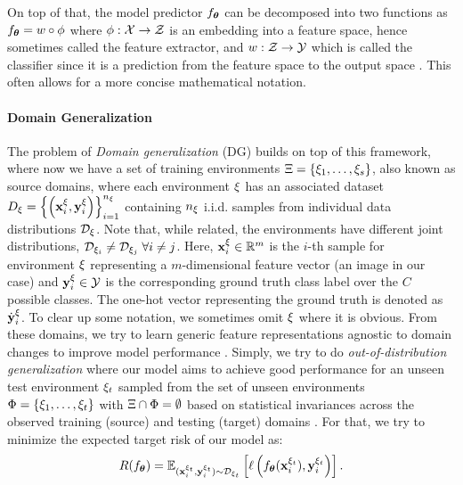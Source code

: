 On top of that, the model predictor $f_{\boldsymbol{\theta}}$ can be decomposed into two functions as $f_{\boldsymbol{\theta}} = w \circ \phi$ where $\phi: \mathcal{X} \rightarrow \mathcal{Z}$ is an embedding into a feature space, hence sometimes called the feature extractor, and $w: \mathcal{Z} \rightarrow \mathcal{Y}$ which is called the classifier since it is a prediction from the feature space to the output space \citep{gulrajani2020search, MotiianPAD17}. This often allows for a more concise mathematical notation.

\paragraph{Domain Generalization}
The problem of \emph{Domain generalization} (DG) builds on top of this framework, where now we have a set of training environments $\Xi = \left\{\xi_{1}, \ldots, \xi_{s} \right\}$, also known as source domains, where each environment $\xi$ has an associated dataset $D_{\xi}=\left\{\left(\mathbf{x}_i^{\xi}, \mathbf{y}_i^{\xi}\right)\right\}_{i=1}^{n_{\xi}}$ containing $n_\xi$ i.i.d. samples from individual data distributions $\mathcal{D}_\xi$. Note that, while related, the environments have different joint distributions, \ie $\mathcal{D}_{\xi_i}\neq \mathcal{D}_{\xi_j} \;\forall i\neq j$. Here, $\mathbf{x}_i^\xi \in \mathbb{R}^{m}$ is the $i$-th sample for environment $\xi$ representing a $m$-dimensional feature vector (\ie an image in our case) and $\mathbf{y}_i^\xi \in \mathcal{Y}$ is the corresponding ground truth class label over the $C$ possible classes. The one-hot vector representing the ground truth is denoted as $\dot{\mathbf{y}}_i^\xi$. To clear up some notation, we sometimes omit $\xi$ where it is obvious. From these domains, we try to learn generic feature representations agnostic to domain changes to improve model performance \citep{seo2019learning}. Simply, we try to do \emph{out-of-distribution generalization} where our model aims to achieve good performance for an unseen test environment $\xi_t$ sampled from the set of unseen environments $\Phi = \left\{\xi_{1}, \ldots, \xi_{t}\right\}$ with $\Xi \cap \Phi =\emptyset$ based on statistical invariances across the observed training (source) and testing (target) domains \citep{gulrajani2020search, huang2020selfchallenging}. For that, we try to minimize the expected target risk of our model as:
\begin{equation}
\label{eq:domain_risk}
    R(f_{\boldsymbol{\theta}}) = \mathbb{E}_{(\mathbf{x}_i^{\xi_t}, \mathbf{y}_i^{\xi_t}) \sim \mathcal{D}_{\xi_t}}\left[\ell\left(f_{\boldsymbol{\theta}}(\mathbf{x}_i^{\xi_t}), \mathbf{y}_i^{\xi_t}\right)\right].
\end{equation}
